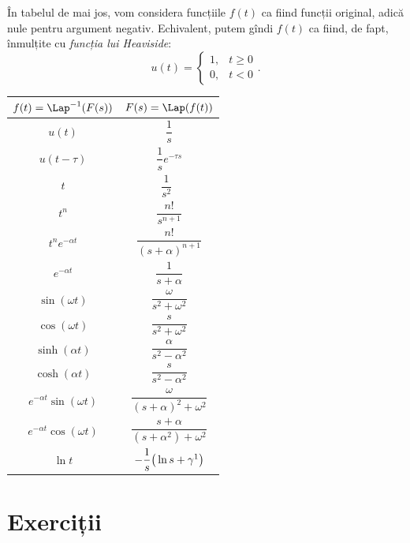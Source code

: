 \indent\indent În tabelul de mai jos, vom considera funcțiile $ f(t) $ ca fiind funcții original,
adică nule pentru argument negativ. Echivalent, putem gîndi $ f(t) $ ca fiind, de fapt,
înmulțite cu \emph{funcția lui Heaviside}:
\[
    u(t) =
    \begin{cases}
        1, & t \geq 0 \\
        0, & t < 0 
    \end{cases}.
\]

\begin{center}
    \begin{tabular}{c | c}
        $ f(t) = \Lap^{-1} (F(s)) $ & $ F(s) = \Lap(f(t)) $ \\
        \hline\hline
        $ u(t) $ & $ \dfrac{1}{s} $ \\
        $ u(t - \tau) $ & $ \dfrac{1}{s} e^{-\tau s} $ \\
        $ t $ & $ \dfrac{1}{s^2} $ \\
        $ t^n $ & $ \dfrac{n!}{s^{n+1}} $ \\
        $ t^n e^{-\alpha t} $ & $ \dfrac{n!}{(s + \alpha)^{n+1}} $ \\
        $ e^{-\alpha t} $ & $ \dfrac{1}{s + \alpha} $ \\
        $ \sin (\omega t) $ & $ \dfrac{\omega}{s^2 + \omega^2} $ \\
        $ \cos (\omega t) $ & $ \dfrac{s}{s^2 + \omega^2} $ \\
        $ \sinh(\alpha t) $ & $ \dfrac{\alpha}{s^2 - \alpha^2} $ \\
        $ \cosh(\alpha t) $ & $ \dfrac{s}{s^2 - \alpha^2} $ \\
        $ e^{-\alpha t}\sin(\omega t) $ & $ \dfrac{\omega}{(s + \alpha)^2 + \omega^2} $ \\
        $ e^{-\alpha t}\cos(\omega t) $ & $ \dfrac{s + \alpha}{(s + \alpha^2) + \omega^2} $ \\
        $ \ln t $ & $ -\dfrac{1}{s} \big( \ln s + \gamma\footnotemark \big) $
    \end{tabular}
\end{center}



\newpage
\section{Exerciții}

